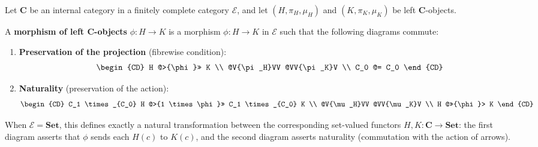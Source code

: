 Let $\mathbf{C}$ be an internal category in a finitely complete category $\mathcal{E}$, and let $(H, \pi_H, \mu_H)$ and $(K, \pi_K, \mu_K)$ be left $\mathbf{C}$-objects.

A \textbf{morphism of left $\mathbf{C}$-objects} $\phi : H \to K$ is a morphism $\phi : H \to K$ in $\mathcal{E}$ such that the following diagrams commute:

\begin{enumerate}
\item \textbf{Preservation of the projection} (fibrewise condition):
\[
\begin{CD}
H @>{\phi}>> K \\
@V{\pi_H}VV @VV{\pi_K}V \\
C_0 @= C_0
\end{CD}
\]

\item \textbf{Naturality} (preservation of the action):
\[
\begin{CD}
C_1 \times_{C_0} H @>{1 \times \phi}>> C_1 \times_{C_0} K \\
@V{\mu_H}VV @VV{\mu_K}V \\
H @>>{\phi}> K
\end{CD}
\]
\end{enumerate}

When $\mathcal{E} = \mathbf{Set}$, this defines exactly a natural transformation between the corresponding set-valued functors $H, K : \mathbf{C} \to \mathbf{Set}$: the first diagram asserts that $\phi$ sends each $H(c)$ to $K(c)$, and the second diagram asserts naturality (commutation with the action of arrows).
